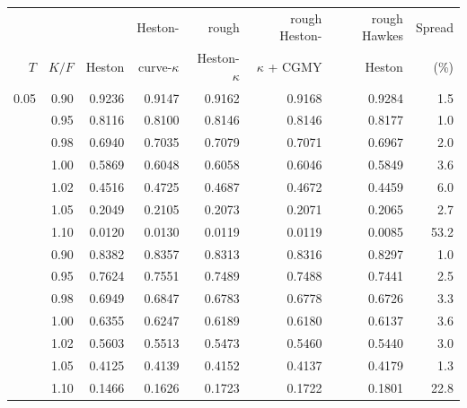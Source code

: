 \begin{tabular}{rrrrrrrr}
\toprule
 &  &  & Heston- & rough & rough Heston- & rough Hawkes & Spread\\
$T$ & $K/F$ & Heston & curve-$\kappa$ & Heston-$\kappa$ & $\kappa$ + CGMY & Heston & (\%)\\
\midrule
0.05 & 0.90 & 0.9236 & 0.9147 & 0.9162 & 0.9168 & 0.9284 & 1.5\\
 & 0.95 & 0.8116 & 0.8100 & 0.8146 & 0.8146 & 0.8177 & 1.0\\
 & 0.98 & 0.6940 & 0.7035 & 0.7079 & 0.7071 & 0.6967 & 2.0\\
 & 1.00 & 0.5869 & 0.6048 & 0.6058 & 0.6046 & 0.5849 & 3.6\\
 & 1.02 & 0.4516 & 0.4725 & 0.4687 & 0.4672 & 0.4459 & 6.0\\
 & 1.05 & 0.2049 & 0.2105 & 0.2073 & 0.2071 & 0.2065 & 2.7\\
 & 1.10 & 0.0120 & 0.0130 & 0.0119 & 0.0119 & 0.0085 & 53.2\\
\addlinespace
0.25 & 0.90 & 0.8382 & 0.8357 & 0.8313 & 0.8316 & 0.8297 & 1.0\\
 & 0.95 & 0.7624 & 0.7551 & 0.7489 & 0.7488 & 0.7441 & 2.5\\
 & 0.98 & 0.6949 & 0.6847 & 0.6783 & 0.6778 & 0.6726 & 3.3\\
 & 1.00 & 0.6355 & 0.6247 & 0.6189 & 0.6180 & 0.6137 & 3.6\\
 & 1.02 & 0.5603 & 0.5513 & 0.5473 & 0.5460 & 0.5440 & 3.0\\
 & 1.05 & 0.4125 & 0.4139 & 0.4152 & 0.4137 & 0.4179 & 1.3\\
 & 1.10 & 0.1466 & 0.1626 & 0.1723 & 0.1722 & 0.1801 & 22.8\\
\bottomrule
\end{tabular}
